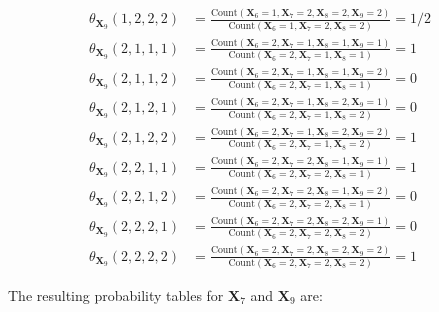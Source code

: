\documentclass[11pt,fancychapters]{article}
\begin{document}
\begin{align*}
	\theta_{\mathbf{X}_9}(1, 2, 2, 2) &= \frac{\text{Count}(\mathbf{X}_6 = 1, \mathbf{X}_7 = 2, \mathbf{X}_8 = 2, \mathbf{X}_9 = 2)}{\text{Count}(\mathbf{X}_6 = 1, \mathbf{X}_7 = 2, \mathbf{X}_8 = 2)} = 1/2 \\
	\theta_{\mathbf{X}_9}(2, 1, 1, 1) &= \frac{\text{Count}(\mathbf{X}_6 = 2, \mathbf{X}_7 = 1, \mathbf{X}_8 = 1, \mathbf{X}_9 = 1)}{\text{Count}(\mathbf{X}_6 = 2, \mathbf{X}_7 = 1, \mathbf{X}_8 = 1)} = 1 \\
	\theta_{\mathbf{X}_9}(2, 1, 1, 2) &= \frac{\text{Count}(\mathbf{X}_6 = 2, \mathbf{X}_7 = 1, \mathbf{X}_8 = 1, \mathbf{X}_9 = 2)}{\text{Count}(\mathbf{X}_6 = 2, \mathbf{X}_7 = 1, \mathbf{X}_8 = 1)} = 0 \\
	\theta_{\mathbf{X}_9}(2, 1, 2, 1) &= \frac{\text{Count}(\mathbf{X}_6 = 2, \mathbf{X}_7 = 1, \mathbf{X}_8 = 2, \mathbf{X}_9 = 1)}{\text{Count}(\mathbf{X}_6 = 2, \mathbf{X}_7 = 1, \mathbf{X}_8 = 2)} = 0 \\
	\theta_{\mathbf{X}_9}(2, 1, 2, 2) &= \frac{\text{Count}(\mathbf{X}_6 = 2, \mathbf{X}_7 = 1, \mathbf{X}_8 = 2, \mathbf{X}_9 = 2)}{\text{Count}(\mathbf{X}_6 = 2, \mathbf{X}_7 = 1, \mathbf{X}_8 = 2)} = 1 \\
	\theta_{\mathbf{X}_9}(2, 2, 1, 1) &= \frac{\text{Count}(\mathbf{X}_6 = 2, \mathbf{X}_7 = 2, \mathbf{X}_8 = 1, \mathbf{X}_9 = 1)}{\text{Count}(\mathbf{X}_6 = 2, \mathbf{X}_7 = 2, \mathbf{X}_8 = 1)} = 1 \\
	\theta_{\mathbf{X}_9}(2, 2, 1, 2) &= \frac{\text{Count}(\mathbf{X}_6 = 2, \mathbf{X}_7 = 2, \mathbf{X}_8 = 1, \mathbf{X}_9 = 2)}{\text{Count}(\mathbf{X}_6 = 2, \mathbf{X}_7 = 2, \mathbf{X}_8 = 1)} = 0 \\
	\theta_{\mathbf{X}_9}(2, 2, 2, 1) &= \frac{\text{Count}(\mathbf{X}_6 = 2, \mathbf{X}_7 = 2, \mathbf{X}_8 = 2, \mathbf{X}_9 = 1)}{\text{Count}(\mathbf{X}_6 = 2, \mathbf{X}_7 = 2, \mathbf{X}_8 = 2)} = 0 \\
	\theta_{\mathbf{X}_9}(2, 2, 2, 2) &= \frac{\text{Count}(\mathbf{X}_6 = 2, \mathbf{X}_7 = 2, \mathbf{X}_8 = 2, \mathbf{X}_9 = 2)}{\text{Count}(\mathbf{X}_6 = 2, \mathbf{X}_7 = 2, \mathbf{X}_8 = 2)} = 1
\end{align*}

The resulting probability tables for $\mathbf{X}_7$ and $\mathbf{X}_9$ are:
\end{document}
